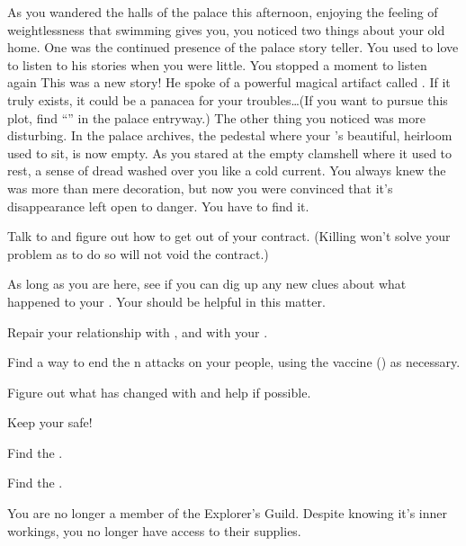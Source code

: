 \documentclass[char]{NeptuneBall}
\begin{document}
As you wandered the halls of the palace this afternoon, enjoying the feeling of weightlessness that swimming gives you, you noticed two things about your old home. One was the continued presence of the palace story teller. You used to love to listen to his stories when you were little. You stopped a moment to listen again This was a new story! He spoke of a powerful magical artifact called \iWishingStone{\MYname}. If it truly exists, it could be a panacea for your troubles\ldots (If you want to pursue this plot, find ``\sOldMan{}'' in the palace entryway.) The other thing you noticed was more disturbing. In the palace archives, the pedestal where your \cAthena{\parent}'s beautiful, heirloom \iMusicBox{} used to sit, is now empty. As you stared at the empty clamshell where it used to rest, a sense of dread washed over you like a cold current. You always knew the \iMusicBox{} was more than mere decoration, but now you were convinced that it's disappearance left \pAtlantis{} open to danger. You have to find it.


\begin{itemz}[Goals]
  \item Talk to \cWitch{} and figure out how to get out of your contract. (Killing \cWitch{} won't solve your problem as to do so will not void the contract.)
  \item As long as you are here, see if you can dig up any new  clues about what happened to your \cAthena{\parent}. Your \cPrincess{\sibling} should be helpful in this matter.
  \item Repair your relationship with \cKing{\King} \cKing{}, and with your \cPrincess{\sibling} \cPrincess{}.
	\item Find a way to end the \pPacifica{}n attacks on your people, using the vaccine (\iVaccine{}) as necessary.
  \item Figure out what has changed with \cPriest{} and help \cPriest{\them} if possible.
  \item Keep your \cWillow{\offspring} safe!
  \item Find the \iWishingStone{}.
  \item Find the \iMusicBox{}.
\end{itemz}

\begin{itemz}[Notes]
  \item You are no longer a member of the Explorer's Guild. Despite knowing it's inner workings, you no longer have access to their supplies.
\end{itemz}
\end{document}
